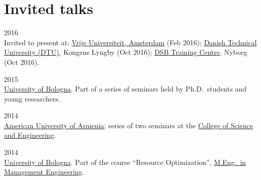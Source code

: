 \section*{Invited talks}

\begin{paracol}{2}
  \textsc{2016}
\switchcolumn
  \\
  Invited to present at: \href{https://www.vu.nl/}{Vrije Universiteit, Amsterdam} (Feb 2016); \href{https://www.dtu.dk/}{Danish Technical University (DTU)}, Kongens Lyngby (Oct 2016); \href{https://www.dsb.dk/}{DSB Training Centre}, Nyborg (Oct 2016).
\end{paracol}

\begin{paracol}{2}
  \textsc{2015}
\switchcolumn
  \\
  \href{https://www.unibo.it}{University of Bologna}. Part of a series of seminars held by Ph.D.\ students and young researchers.
\end{paracol}

\begin{paracol}{2}
  \textsc{2014}
\switchcolumn
  \\
  \href{https://www.aua.am/}{American University of Armenia}; series of two seminars at the \href{http://cse.aua.am/}{College of Science and Engineering}.
\end{paracol}

\begin{paracol}{2}
  \textsc{2014}
\switchcolumn
  \\
  \href{https://www.unibo.it}{University of Bologna}. Part of the course ``Resource Optimization'', \href{https://corsi.unibo.it/magistrale/IngegneriaGestionale}{M.Eng.\ in Management Engineering}.
\end{paracol}
